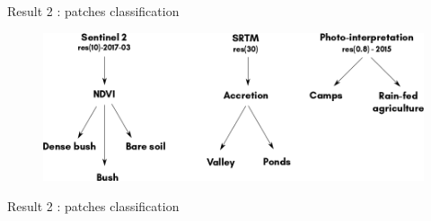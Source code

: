 \documentclass[newPxFont]{beamer}
\begin{document}
\begin{frame}[c]{Result 2 : patches classification}
\vspace{-1cm}
\begin{figure}
  \centering
  \includegraphics[width = \textwidth]{img/process}
\end{figure}
\end{frame}

\begin{frame}[c]{Result 2 : patches classification}
\vspace{-1cm}
\begin{figure}
  \hspace*{-1cm}
	~
  ~
\end{figure}
\end{frame}
\end{document}
